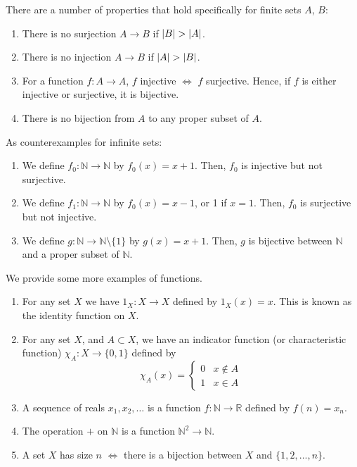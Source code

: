 There are a number of properties that hold specifically for finite sets \(A\), \(B\):
\begin{enumerate}
	\item There is no surjection \(A \to B\) if \(\abs{B} > \abs{A}\).
	\item There is no injection \(A \to B\) if \(\abs{A} > \abs{B}\).
	\item For a function \(f\colon A \to A\), \(f\) injective \(\iff\) \(f\) surjective.
	      Hence, if \(f\) is either injective or surjective, it is bijective.
	\item There is no bijection from \(A\) to any proper subset of \(A\).
\end{enumerate}
As counterexamples for infinite sets:
\begin{enumerate}
	\item We define \(f_0\colon \mathbb N \to \mathbb N\) by \(f_0(x) = x+1\).
	      Then, \(f_0\) is injective but not surjective.
	\item We define \(f_1\colon \mathbb N \to \mathbb N\) by \(f_0(x) = x-1\), or 1 if \(x=1\).
	      Then, \(f_0\) is surjective but not injective.
	\item We define \(g\colon \mathbb N \to \mathbb N \setminus \{ 1 \}\) by \(g(x) = x+1\).
	      Then, \(g\) is bijective between \(\mathbb N\) and a proper subset of \(\mathbb N\).
\end{enumerate}
We provide some more examples of functions.
\begin{enumerate}
	\item For any set \(X\) we have \(1_X\colon X \to X\) defined by \(1_X(x) = x\).
	      This is known as the identity function on \(X\).
	\item For any set \(X\), and \(A \subset X\), we have an indicator function (or characteristic function) \(\chi_A\colon X \to \{ 0, 1 \}\) defined by
	      \[
		      \chi_A(x) = \begin{cases}
			      0 & x \notin A \\
			      1 & x \in A
		      \end{cases}
	      \]
	\item A sequence of reals \(x_1, x_2, \dots\) is a function \(f\colon \mathbb N \to \mathbb R\) defined by \(f(n) = x_n\).
	\item The operation \(+\) on \(\mathbb N\) is a function \(\mathbb N^2 \to \mathbb N\).
	\item A set \(X\) has size \(n\) \(\iff\) there is a bijection between \(X\) and \(\{ 1, 2, \dots, n \}\).
\end{enumerate}


